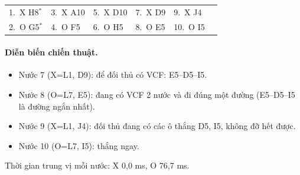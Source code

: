 {\footnotesize\linespread{1}\selectfont
\noindent\begin{tabularx}{\linewidth}{*{6}{X}}
\toprule
1.~X H8$^\ast$ & 3.~X A10 & 5.~X D10 & 7.~X D9 & 9.~X J4 &  \\
2.~O G5$^\ast$ & 4.~O F5 & 6.~O H5 & 8.~O E5 & 10.~O I5 &  \\
\bottomrule
\end{tabularx}\par}
\paragraph{Diễn biến chiến thuật.}
\begin{itemize}\small
\setlength{\itemsep}{0pt}
  \item Nước 7 (X=L1, D9): để đối thủ có VCF: E5--D5--I5.
  \item Nước 8 (O=L7, E5): đang có VCF 2 nước và đi đúng một đường (E5--D5--I5 là đường ngắn nhất).
  \item Nước 9 (X=L1, J4): đối thủ đang có các ô thắng D5, I5, không đỡ hết được.
  \item Nước 10 (O=L7, I5): thắng ngay.
\end{itemize}
Thời gian trung vị mỗi nước: X 0,0 ms, O 76,7 ms.
\clearpage

